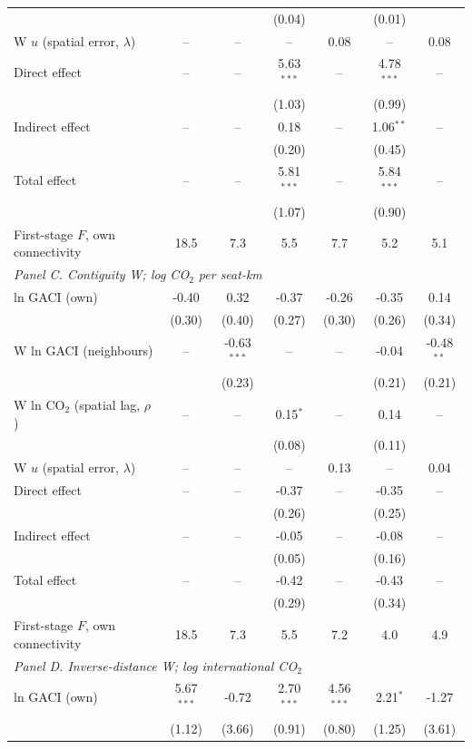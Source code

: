 \begin{table}[htbp]
\begin{threeparttable}
\begin{tabular}{lcccccc}
   &  &  & (0.04) &  & (0.01) &  \\
  W $u$ (spatial error, $\lambda$) & -- & -- & -- & 0.08 & -- & 0.08 \\
  Direct effect & -- & -- & 5.63$^{***}$ & -- & 4.78$^{***}$ & -- \\
   &  &  & (1.03) &  & (0.99) &  \\
  Indirect effect & -- & -- & 0.18 & -- & 1.06$^{**}$ & -- \\
   &  &  & (0.20) &  & (0.45) &  \\
  Total effect & -- & -- & 5.81$^{***}$ & -- & 5.84$^{***}$ & -- \\
   &  &  & (1.07) &  & (0.90) &  \\
  First-stage $F$, own connectivity & 18.5 & 7.3 & 5.5 & 7.7 & 5.2 & 5.1 \\
\midrule
\multicolumn{7}{l}{\textit{Panel C. Contiguity W; log CO$_2$ per seat-km}} \\
  ln GACI (own) & -0.40 & 0.32 & -0.37 & -0.26 & -0.35 & 0.14 \\
   & (0.30) & (0.40) & (0.27) & (0.30) & (0.26) & (0.34) \\
  W ln GACI (neighbours) & -- & -0.63$^{***}$ & -- & -- & -0.04 & -0.48$^{**}$ \\
   &  & (0.23) &  &  & (0.21) & (0.21) \\
  W ln CO$_2$ (spatial lag, $\rho$) & -- & -- & 0.15$^{*}$ & -- & 0.14 & -- \\
   &  &  & (0.08) &  & (0.11) &  \\
  W $u$ (spatial error, $\lambda$) & -- & -- & -- & 0.13 & -- & 0.04 \\
  Direct effect & -- & -- & -0.37 & -- & -0.35 & -- \\
   &  &  & (0.26) &  & (0.25) &  \\
  Indirect effect & -- & -- & -0.05 & -- & -0.08 & -- \\
   &  &  & (0.05) &  & (0.16) &  \\
  Total effect & -- & -- & -0.42 & -- & -0.43 & -- \\
   &  &  & (0.29) &  & (0.34) &  \\
  First-stage $F$, own connectivity & 18.5 & 7.3 & 5.5 & 7.2 & 4.0 & 4.9 \\
\midrule
\multicolumn{7}{l}{\textit{Panel D. Inverse-distance W; log international CO$_2$}} \\
  ln GACI (own) & 5.67$^{***}$ & -0.72 & 2.70$^{***}$ & 4.56$^{***}$ & 2.21$^{*}$ & -1.27 \\
   & (1.12) & (3.66) & (0.91) & (0.80) & (1.25) & (3.61) \\

\end{tabular}
\end{threeparttable}
\end{table}
